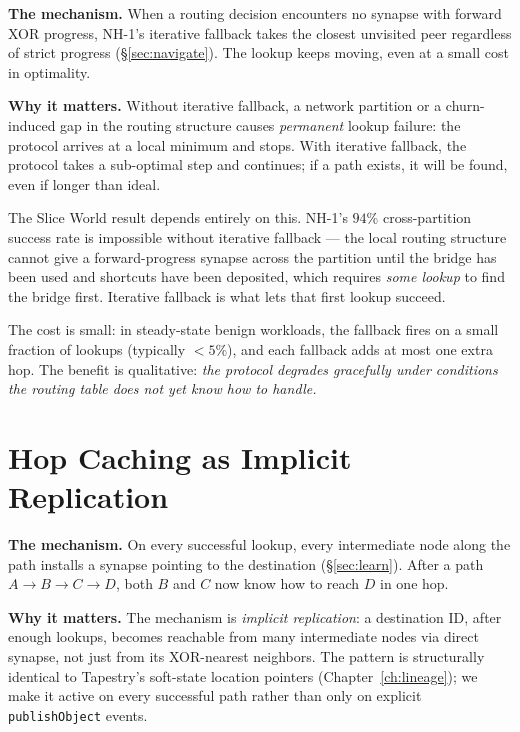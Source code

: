 \documentclass[twoside,nobib]{tufte-book}
\begin{document}
\textbf{The mechanism.} When a routing decision encounters no
synapse with forward XOR progress, NH-1's iterative fallback
takes the closest unvisited peer regardless of strict progress
(\S\ref{sec:navigate}). The lookup keeps moving, even at a small
cost in optimality.

\textbf{Why it matters.} Without iterative fallback, a network
partition or a churn-induced gap in the routing structure causes
\emph{permanent} lookup failure: the protocol arrives at a local
minimum and stops. With iterative fallback, the protocol takes
a sub-optimal step and continues; if a path exists, it will be
found, even if longer than ideal.

The Slice World result depends entirely on this. NH-1's $94\%$
cross-partition success rate is impossible without iterative
fallback --- the local routing structure cannot give a
forward-progress synapse across the partition until the bridge
has been used and shortcuts have been deposited, which requires
\emph{some lookup} to find the bridge first. Iterative fallback
is what lets that first lookup succeed.

The cost is small: in steady-state benign workloads, the
fallback fires on a small fraction of lookups
(typically $< 5\%$), and each fallback adds at most one extra
hop. The benefit is qualitative: \emph{the protocol degrades
gracefully under conditions the routing table does not yet
know how to handle.}

\section{Hop Caching as Implicit Replication}

\textbf{The mechanism.} On every successful lookup, every
intermediate node along the path installs a synapse pointing to
the destination (\S\ref{sec:learn}). After a path
$A \to B \to C \to D$, both $B$ and $C$ now know how to reach
$D$ in one hop.

\textbf{Why it matters.} The mechanism is \emph{implicit
replication}: a destination ID, after enough lookups, becomes
reachable from many intermediate nodes via direct synapse, not
just from its XOR-nearest neighbors. The pattern is structurally
identical to Tapestry's soft-state location pointers
(Chapter~\ref{ch:lineage}); we make it active on every successful
path rather than only on explicit \texttt{publishObject} events.
\end{document}
